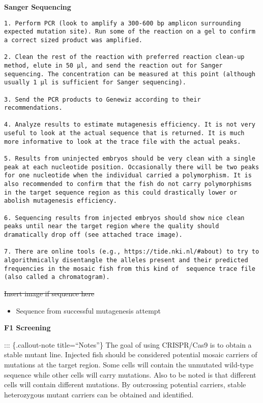 \documentclass[
  letterpaper,
  DIV=11,
  numbers=noendperiod]{scrreprt}
\providecommand{\tightlist}{%
  \setlength{\itemsep}{0pt}\setlength{\parskip}{0pt}}\usepackage{longtable,booktabs,array}
\begin{document}
\textbf{Sanger Sequencing}

\begin{verbatim}
1. Perform PCR (look to amplify a 300-600 bp amplicon surrounding expected mutation site). Run some of the reaction on a gel to confirm a correct sized product was amplified. 

2. Clean the rest of the reaction with preferred reaction clean-up method, elute in 50 µl, and send the reaction out for Sanger sequencing. The concentration can be measured at this point (although usually 1 µl is sufficient for Sanger sequencing).     

3. Send the PCR products to Genewiz according to their recommendations. 

4. Analyze results to estimate mutagenesis efficiency. It is not very useful to look at the actual sequence that is returned. It is much more informative to look at the trace file with the actual peaks. 

5. Results from uninjected embryos should be very clean with a single peak at each nucleotide position. Occasionally there will be two peaks for one nucleotide when the individual carried a polymorphism. It is also recommended to confirm that the fish do not carry polymorphisms in the target sequence region as this could drastically lower or abolish mutagenesis efficiency. 

6. Sequencing results from injected embryos should show nice clean peaks until near the target region where the quality should dramatically drop off (see attached trace image). 

7. There are online tools (e.g., https://tide.nki.nl/#about) to try to algorithmically disentangle the alleles present and their predicted frequencies in the mosaic fish from this kind of  sequence trace file (also called a chromatogram). 
\end{verbatim}

\st{Insert image if sequence here}

\begin{itemize}
\tightlist
\item
  Sequence from successful mutagenesis attempt
\end{itemize}

\textbf{F1 Screening}

::: \{.callout-note title=``Notes''\} The goal of using CRISPR/Cas9 is
to obtain a stable mutant line. Injected fish should be considered
potential mosaic carriers of mutations at the target region. Some cells
will contain the unmutated wild-type sequence while other cells will
carry mutations. Also to be noted is that different cells will contain
different mutations. By outcrossing potential carriers, stable
heterozygous mutant carriers can be obtained and identified.
\end{document}
